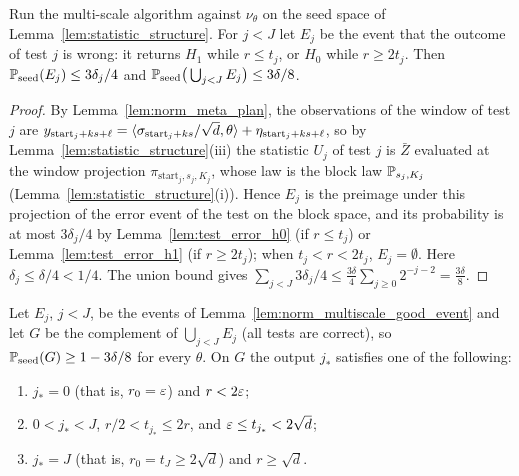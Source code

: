 \begin{lemma}\label{lem:norm_multiscale_good_event}
\leanok
{}
Run the multi-scale algorithm against $\nu_\theta$ on the seed space of
Lemma~\ref{lem:statistic_structure}. For $j < J$ let $E_j$ be the event that the outcome of
test $j$ is wrong: it returns $H_1$ while $r \le t_j$, or $H_0$ while $r \ge 2t_j$.
Then $\mathbb{P}_{\mathrm{seed}}(E_j) \le 3\delta_j/4$ and
$\mathbb{P}_{\mathrm{seed}}\big( \bigcup_{j<J} E_j \big) \le 3\delta/8$.
\end{lemma}

\begin{proof}
\leanok
{}
By Lemma~\ref{lem:norm_meta_plan}, the observations of the window of test $j$ are
$y_{\mathrm{start}_j + ks + \ell} = \langle \sigma_{\mathrm{start}_j+ks}/\sqrt d, \theta \rangle
+ \eta_{\mathrm{start}_j+ks+\ell}$, so by Lemma~\ref{lem:statistic_structure}(iii) the
statistic $U_j$ of test $j$ is $\bar Z$ evaluated at the window projection
$\pi_{\mathrm{start}_j, s_j, K_j}$, whose law is the block law $\mathbb{P}_{s_j,K_j}$
(Lemma~\ref{lem:statistic_structure}(i)). Hence $E_j$ is the preimage under this
projection of the error event of the test on the block space, and its probability is at
most $3\delta_j/4$ by Lemma~\ref{lem:test_error_h0} (if $r \le t_j$) or
Lemma~\ref{lem:test_error_h1} (if $r \ge 2t_j$); when $t_j < r < 2t_j$, $E_j = \emptyset$.
Here $\delta_j \le \delta/4 < 1/4$. The union bound gives
$\sum_{j<J} 3\delta_j/4 \le \frac{3\delta}{4}\sum_{j\ge0}2^{-j-2} = \frac{3\delta}{8}$.
\end{proof}

\begin{theorem}\label{thm:multiscale_guarantee}
\leanok
{}
Let $E_j$, $j < J$, be the events of Lemma~\ref{lem:norm_multiscale_good_event} and let $G$
be the complement of $\bigcup_{j<J}E_j$ (all tests are correct), so
$\mathbb{P}_{\mathrm{seed}}(G) \ge 1 - 3\delta/8$ for every $\theta$. On $G$ the output $j_*$
satisfies one of the following:
\begin{enumerate}
  \item[(a)] $j_* = 0$ (that is, $r_0 = \varepsilon$) and $r < 2\varepsilon$;
  \item[(b)] $0 < j_* < J$, $r/2 < t_{j_*} \le 2r$, and $\varepsilon \le t_{j_*} < 2\sqrt d$;
  \item[(c)] $j_* = J$ (that is, $r_0 = t_J \ge 2\sqrt d$) and $r \ge \sqrt d$.
\end{enumerate}
\end{theorem}

